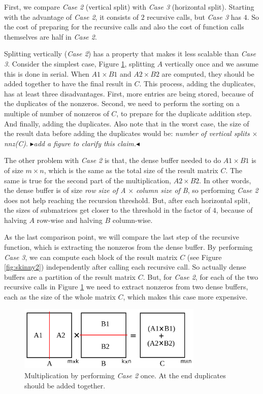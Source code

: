 \documentclass[conference,10pt]{IEEEtran}
\newcommand{\mr}[1]{\mynote{Majid}{blue}{#1}}
\newcommand{\mynote}[3]{
	\textcolor{#2}{\fbox{\bfseries\sffamily\scriptsize#1}}
		{\small$\blacktriangleright$\textsf{\emph{#3}}$\blacktriangleleft$}
}
\begin{document}
First, we compare \textit{Case 2} (vertical split) with \textit{Case 3} (horizontal split). Starting with the advantage of \textit{Case 2}, it consists of $2$ recursive calls, but \textit{Case 3} has $4$. So the cost of preparing for the recursive calls and also the cost of function calls themselves are half in \textit{Case 2}. 

Splitting vertically (\textit{Case 2}) has a property that makes it less scalable than \textit{Case 3}. Consider the simplest case, Figure \ref{fig:skinny1}, splitting $A$ vertically once and we assume this is done in serial. When $A1 \times B1$ and $A2 \times B2$ are computed, they should be added together to have the final result in $C$. This process, adding the duplicates, has at least three disadvantages. First, more entries are being stored, because of the duplicates of the nonzeros. Second, we need to perform the sorting on a multiple of number of nonzeros of $C$, to prepare for the duplicate addition step. And finally, adding the duplicates. Also note that in the worst case, the size of the result data before adding the duplicates would be: \textit{number of vertical splits} $\times$ \textit{nnz(C)}. \mr{add a figure to clarify this claim.} 

The other problem with \textit{Case 2} is that, the dense buffer needed to do $A1 \times B1$ is of size $m \times n$, which is the same as the total size of the result matrix $C$. The same is true for the second part of the multiplication, $A2 \times B2$. In other words, the dense buffer is of size \textit{row size of A} $\times$ \textit{column size of B}, so performing \textit{Case 2} does not help reaching the recursion threshold.
But, after each horizontal split, the sizes of submatrices get closer to the threshold in the factor of $4$, because of halving $A$ row-wise and halving $B$ column-wise.

As the last comparison point, we will compare the last step of the recursive function, which is extracting the nonzeros from the dense buffer.
By performing \textit{Case 3}, we can compute each block of the result matrix $C$ (see Figure \ref{fig:skinny2}) independently after calling each recursive call. So actually dense buffers are a partition of the result matrix $C$. But, for \textit{Case 2}, for each of the two recursive calls in Figure \ref{fig:skinny1} we need to extract nonzeros from two dense buffers, each as the size of the whole matrix $C$, which makes this case more expensive.

\begin{figure}[thb]
    \includegraphics[width=8.8cm,height=3.1cm]{./figures/skinny001.pdf}
    \caption{Multiplication by performing \textit{Case 2} once. At the end duplicates should be added together.}
    \label{fig:skinny1}
\end{figure}
\end{document}
